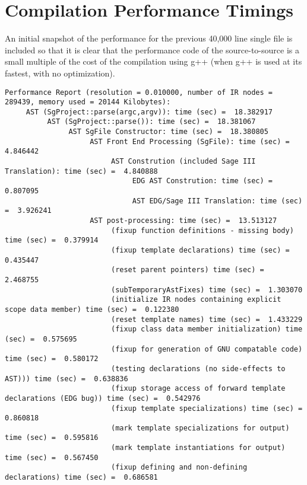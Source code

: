 
\section{Compilation Performance Timings}

    An initial snapshot of the performance for the previous 40,000 line
single file is included so that it is clear that the performance code of
the source-to-source is a small multiple of the cost of the compilation
using g++ (when g++ is used at its fastest, with no optimization).

{\mySmallestFontSize
\begin{verbatim}
Performance Report (resolution = 0.010000, number of IR nodes = 289439, memory used = 20144 Kilobytes):
     AST (SgProject::parse(argc,argv)): time (sec) =  18.382917
          AST (SgProject::parse()): time (sec) =  18.381067
               AST SgFile Constructor: time (sec) =  18.380805
                    AST Front End Processing (SgFile): time (sec) =  4.846442
                         AST Constrution (included Sage III Translation): time (sec) =  4.840888
                              EDG AST Constrution: time (sec) =  0.807095
                              AST EDG/Sage III Translation: time (sec) =  3.926241
                    AST post-processing: time (sec) =  13.513127
                         (fixup function definitions - missing body) time (sec) =  0.379914
                         (fixup template declarations) time (sec) =  0.435447
                         (reset parent pointers) time (sec) =  2.468755
                         (subTemporaryAstFixes) time (sec) =  1.303070
                         (initialize IR nodes containing explicit scope data member) time (sec) =  0.122380
                         (reset template names) time (sec) =  1.433229
                         (fixup class data member initialization) time (sec) =  0.575695
                         (fixup for generation of GNU compatable code) time (sec) =  0.580172
                         (testing declarations (no side-effects to AST))) time (sec) =  0.638836
                         (fixup storage access of forward template declarations (EDG bug)) time (sec) =  0.542976
                         (fixup template specializations) time (sec) =  0.860818
                         (mark template specializations for output) time (sec) =  0.595816
                         (mark template instantiations for output) time (sec) =  0.567450
                         (fixup defining and non-defining declarations) time (sec) =  0.686581

\end{verbatim}}
